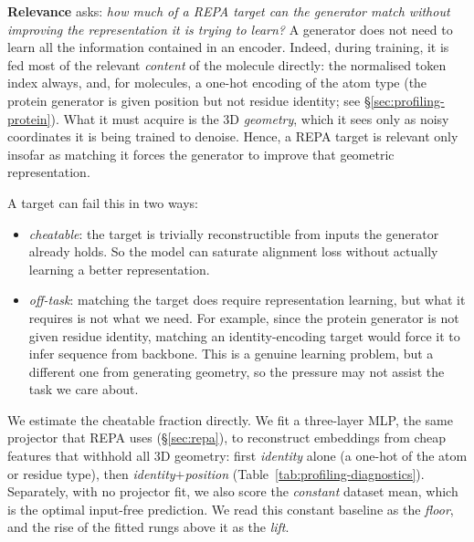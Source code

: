 \documentclass[12pt,a4paper,twoside]{report}
\begin{document}
\textbf{Relevance} asks: \emph{how much of a REPA target can the generator match without improving the representation it is trying to learn?} A generator does not need to learn all the information contained in an encoder. Indeed, during training, it is fed most of the relevant \emph{content} of the molecule directly: the normalised token index always, and, for molecules, a one-hot encoding of the atom type (the protein generator is given position but not residue identity; see \S\ref{sec:profiling-protein}). What it must acquire is the 3D \emph{geometry}, which it sees only as noisy coordinates it is being trained to denoise. Hence, a REPA target is relevant only insofar as matching it forces the generator to improve that geometric representation.

A target can fail this in two ways:
\begin{itemize}[topsep=2pt,itemsep=1pt]
  \item \emph{cheatable}: the target is trivially reconstructible from inputs the generator already holds. So the model can saturate alignment loss without actually learning a better representation.
  \item \emph{off-task}: matching the target does require representation learning, but what it requires is not what we need. For example, since the protein generator is not given residue identity, matching an identity-encoding target would force it to infer sequence from backbone. This is a genuine learning problem, but a different one from generating geometry, so the pressure may not assist the task we care about.
\end{itemize}

We estimate the cheatable fraction directly. We fit a three-layer MLP, the same projector that REPA uses (\S\ref{sec:repa}), to reconstruct embeddings from cheap features that withhold all 3D geometry: first \emph{identity} alone (a one-hot of the atom or residue type), then \emph{identity${+}$position} (Table~\ref{tab:profiling-diagnostics}). Separately, with no projector fit, we also score the \emph{constant} dataset mean, which is the optimal input-free prediction. We read this constant baseline as the \emph{floor}, and the rise of the fitted rungs above it as the \emph{lift}.
\end{document}
